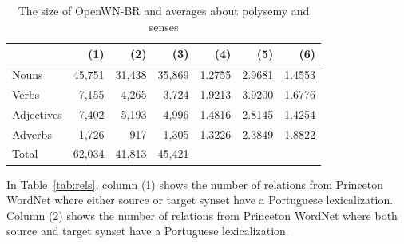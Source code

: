 \documentclass[a4paper,twocolumn]{article}
\begin{document}
\begin{table}[htbp]
\begin{center}
\small
\begin{tabular}{lrrrrrr}
\hline
             &    (1)  &    (2)  &    (3)  &     (4)  &     (5)  &     (6)  \\
\hline
 Nouns       &  45,751  &  31,438  &  35,869  &  1.2755  &  2.9681  &  1.4553  \\
 Verbs       &   7,155  &   4,265  &   3,724  &  1.9213  &  3.9200  &  1.6776  \\
 Adjectives  &   7,402  &   5,193  &   4,996  &  1.4816  &  2.8145  &  1.4254  \\
 Adverbs     &   1,726  &     917  &   1,305  &  1.3226  &  2.3849  &  1.8822  \\
\hline
 Total       &  62,034  &  41,813  &  45,421  &          &          &          \\
\hline
\end{tabular}
\caption{The size of OpenWN-BR and averages about polysemy and senses}\label{tab:size}
\end{center}
\end{table}

In Table~\ref{tab:rels}, column (1) shows the number of relations from
Princeton WordNet where either source or target synset have a
Portuguese lexicalization. Column (2) shows the number of relations
from Princeton WordNet where both source and target synset have a
Portuguese lexicalization.
\end{document}
